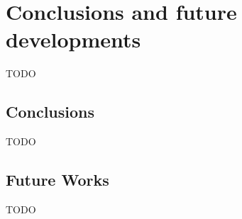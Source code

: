 \chapter{Conclusions and future developments}
\label{ch:conclusions}
TODO


\section{Conclusions}
TODO


\section{Future Works}
TODO


\iffalse
In this chapter, you present the conclusions of your thesis and a couple of possible future works to extend your results. First of all, you should briefly repeat the problem you addressed in the thesis. Then, you report your achievements and how they improve the state of the art.

\section{Conclusions}
In this thesis, we analyzed the problem of ... . We proposed a new approach that ... . We tested this method on ... . Reported results show that our proposal outperforms the state of the art method.

\section{Future works}
There are several appealing paths for future works. A possible extension could be to ... .
\fi
